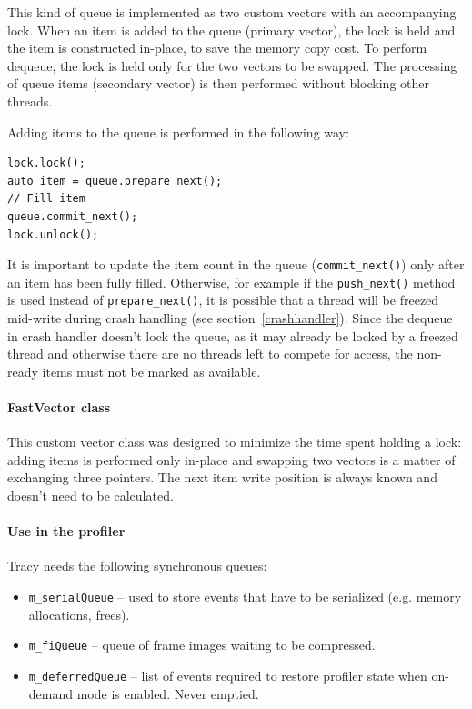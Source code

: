 \documentclass[hidelinks,titlepage,a4paper]{article}
\begin{document}
This kind of queue is implemented as two custom vectors with an accompanying lock. When an item is added to the queue (primary vector), the lock is held and the item is constructed in-place, to save the memory copy cost. To perform dequeue, the lock is held only for the two vectors to be swapped. The processing of queue items (secondary vector) is then performed without blocking other threads.

Adding items to the queue is performed in the following way:

\begin{lstlisting}
lock.lock();
auto item = queue.prepare_next();
// Fill item
queue.commit_next();
lock.unlock();
\end{lstlisting}

It is important to update the item count in the queue (\texttt{commit\_next()}) only after an item has been fully filled. Otherwise, for example if the \texttt{push\_next()} method is used instead of \texttt{prepare\_next()}, it is possible that a thread will be freezed mid-write during crash handling (see section~\ref{crashhandler}). Since the dequeue in crash handler doesn't lock the queue, as it may already be locked by a freezed thread and otherwise there are no threads left to compete for access, the non-ready items must not be marked as available.

\paragraph{FastVector class}

This custom vector class was designed to minimize the time spent holding a lock: adding items is performed only in-place and swapping two vectors is a matter of exchanging three pointers. The next item write position is always known and doesn't need to be calculated.

\paragraph{Use in the profiler}

Tracy needs the following synchronous queues:

\begin{itemize}
\item \texttt{m\_serialQueue} -- used to store events that have to be serialized (e.g. memory allocations, frees).
\item \texttt{m\_fiQueue} -- queue of frame images waiting to be compressed.
\item \texttt{m\_deferredQueue} -- list of events required to restore profiler state when on-demand mode is enabled. Never emptied.
\end{itemize}
\end{document}
